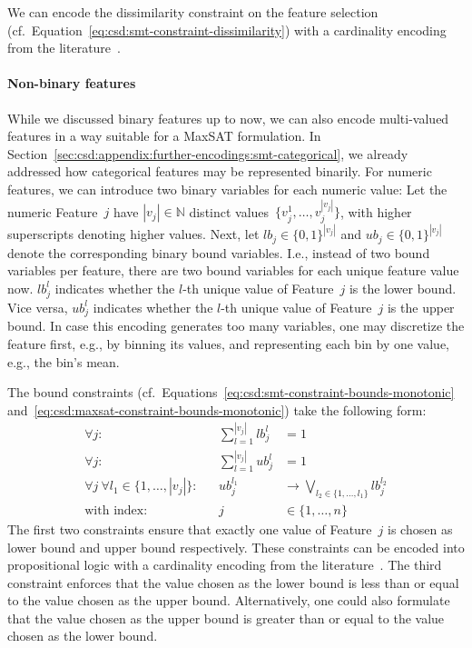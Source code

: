 \documentclass{article}
\theoremstyle{definition}
\begin{document}
We can encode the dissimilarity constraint on the feature selection (cf.~Equation~\ref{eq:csd:smt-constraint-dissimilarity}) with a cardinality encoding from the literature~\cite{sinz2005towards}.

\paragraph{Non-binary features}

While we discussed binary features up to now, we can also encode multi-valued features in a way suitable for a MaxSAT formulation.
In Section~\ref{sec:csd:appendix:further-encodings:smt-categorical}, we already addressed how categorical features may be represented binarily.
For numeric features, we can introduce two binary variables for each numeric value:
Let the numeric Feature~$j$ have $|v_j| \in \mathbb{N}$ distinct values~$\{v^1_j, \dots, v^{|v_j|}_j\}$, with higher superscripts denoting higher values.
Next, let $\mathit{lb}_j \in \{0, 1\}^{|v_j|}$ and $\mathit{ub}_j \in \{0, 1\}^{|v_j|}$ denote the corresponding binary bound variables.
I.e., instead of two bound variables per feature, there are two bound variables for each unique feature value now.
$\mathit{lb}^l_j$ indicates whether the $l$-th unique value of Feature~$j$ is the lower bound.
Vice versa, $\mathit{ub}^l_j$ indicates whether the $l$-th unique value of Feature~$j$ is the upper bound.
In case this encoding generates too many variables, one may discretize the feature first, e.g., by binning its values, and representing each bin by one value, e.g., the bin's mean.

The bound constraints (cf.~Equations~\ref{eq:csd:smt-constraint-bounds-monotonic} and~\ref{eq:csd:maxsat-constraint-bounds-monotonic}) take the following form:
%
\begin{equation}
	\begin{aligned}
		\forall j: & & \sum_{l=1}^{|v_j|} \mathit{lb}^l_j &= 1 \\
		\forall j: & & \sum_{l=1}^{|v_j|} \mathit{ub}^l_j &= 1 \\
		\forall j~ \forall l_1 \in \{1, \dots, |v_j|\}: & & \mathit{ub}^{l_1}_j &\rightarrow \bigvee_{l_2 \in \{1, \dots, l_1\}} \mathit{lb}^{l_2}_j \\
		\text{with index:} & & j &\in \{1, \dots, n\}
	\end{aligned}
	\label{eq:csd:maxsat-numeric-constraint-bounds-monotonic}
\end{equation}
%
The first two constraints ensure that exactly one value of Feature~$j$ is chosen as lower bound and upper bound respectively.
These constraints can be encoded into propositional logic with a cardinality encoding from the literature~\cite{sinz2005towards}.
The third constraint enforces that the value chosen as the lower bound is less than or equal to the value chosen as the upper bound.
Alternatively, one could also formulate that the value chosen as the upper bound is greater than or equal to the value chosen as the lower bound.
\end{document}
